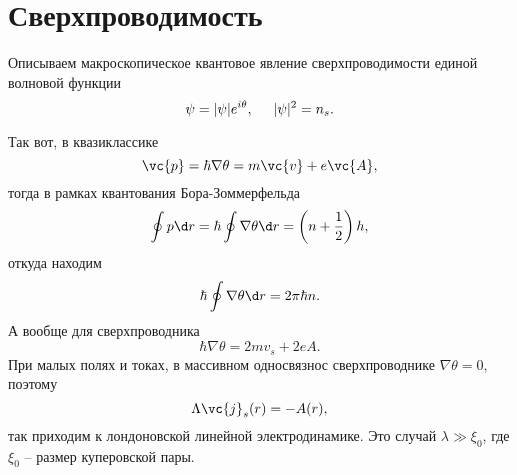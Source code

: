 \section{Сверхпроводимость}

Описываем макроскопическое квантовое явление сверхпроводимости единой волновой функции
\begin{equation*}
	\psi = |\psi| e^{i \theta},
	\hspace{5 mm} 
	|\psi|^2 = n_s.
\end{equation*}




















Так вот, в квазиклассике
\begin{equation*}
	\vc{p} = \hbar \nabla \theta = m \vc{v} + e \vc{A},
\end{equation*}
тогда в рамках квантования Бора-Зоммерфельда
\begin{equation*}
	\oint p \d r = 
	\hbar \oint \nabla \theta \d r
	= 
	 \left(n + \frac{1}{2}\right) h,
\end{equation*}
откуда находим
\begin{equation*}
	\hbar \oint \nabla \theta \d r = 2 \pi \hbar n.
\end{equation*}
А вообще для сверхпроводника
\begin{equation*}
	\hbar \nabla \theta = 2 m v_s + 2 e A.
\end{equation*}
При малых полях и токах, в массивном односвязнос сверхпроводнике $\nabla \theta = 0$, поэтому 
\begin{equation*}
	\Lambda \vc{j}_s (r) = - A(r),
\end{equation*}
так приходим к лондоновской линейной электродинамике. Это случай $\lambda \gg \xi_0$, где $\xi_0$ -- размер куперовской пары. 


